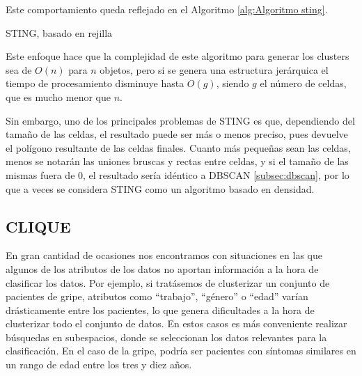 \documentclass[10pt, a4paper]{article}
\begin{document}
Este comportamiento queda reflejado en el Algoritmo \ref{alg:Algoritmo sting}.

\begin{algorithm}[ht]
\SetAlgoLined
  \LinesNumbered
  \DontPrintSemicolon
  \caption{STING, basado en rejilla}
  \label{alg:Algoritmo sting}
\end{algorithm}


Este enfoque hace que la complejidad de este algoritmo para generar los clusters sea de $O\left(n\right)$ para $n$ objetos, pero si se genera una estructura jerárquica el tiempo de procesamiento disminuye hasta $O\left(g\right)$, siendo $g$ el número de celdas, que es mucho menor que $n$.

Sin embargo, uno de los principales problemas de STING es que, dependiendo del tamaño de las celdas, el resultado puede ser más o menos preciso, pues devuelve el polígono resultante de las celdas finales. Cuanto más pequeñas sean las celdas, menos se notarán las uniones bruscas y rectas entre celdas, y si el tamaño de las mismas fuera de 0, el resultado sería idéntico a DBSCAN \ref{subsec:dbscan}, por lo que a veces se considera STING como un algoritmo basado en densidad.




\subsection{\textbf{CLIQUE}} \label{subsec:clique}

En gran cantidad de ocasiones nos encontramos con situaciones en las que algunos de los atributos de los datos no aportan información a la hora de clasificar los datos. Por ejemplo, si tratásemos de clusterizar un conjunto de pacientes de gripe, atributos como ``trabajo'', ``género'' o ``edad'' varían drásticamente entre los pacientes, lo que genera dificultades a la hora de clusterizar todo el conjunto de datos. En estos casos es más conveniente realizar búsquedas en subespacios, donde se seleccionan los datos relevantes para la clasificación. En el caso de la gripe, podría ser pacientes con síntomas similares en un rango de edad entre los tres y diez años. 
\end{document}
